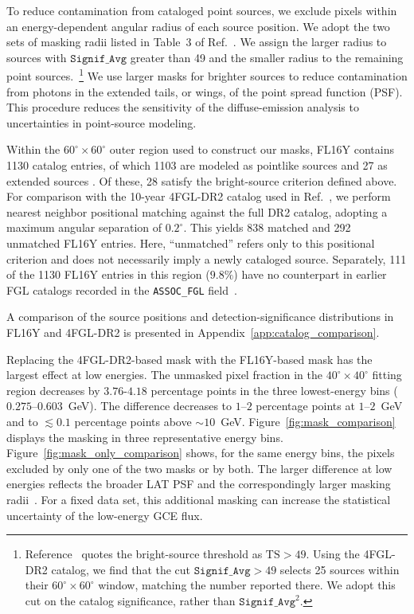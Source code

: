 \documentclass[superscriptaddress,
showpacs,preprintnumbers,nofootinbib,eqsecnum,amsmath,amssymb,aps,11pt, groupedaddress, floatfix]{revtex4-2}
\begin{document}
To reduce contamination from cataloged point sources, we exclude pixels within an energy-dependent angular radius of each source position.
We adopt the two sets of masking radii listed in Table~3 of Ref.~\cite{Cholis:2021rpp}.
We assign the larger radius to sources with $\texttt{Signif\_Avg}$ greater than 49 and the smaller radius to the remaining point sources.~\footnote{Reference~\cite{Cholis:2021rpp} quotes the bright-source threshold as $\mathrm{TS}>49$. Using the 4FGL-DR2 catalog, we find that the cut $\texttt{Signif\_Avg} > 49$ selects 25 sources within their $60^\circ\times60^\circ$ window, matching the number reported there. We adopt this cut on the catalog significance, rather than $\texttt{Signif\_Avg}^2$.}
We use larger masks for brighter sources to reduce contamination from photons in the extended tails, or wings, of the point spread function (PSF).
This procedure reduces the sensitivity of the diffuse-emission analysis to uncertainties in point-source modeling.


Within the $60^\circ\times60^\circ$ outer region used to construct our masks, FL16Y contains 1130 catalog entries, of which 1103 are modeled as pointlike sources and 27 as extended sources \cite{Ballet:2026kpq}. Of these, 28 satisfy the bright-source criterion defined above. For comparison with the 10-year 4FGL-DR2 catalog used in Ref.~\cite{Cholis:2021rpp}, we perform nearest neighbor positional matching against the full DR2 catalog, adopting a maximum angular separation of $0.2^\circ$. This yields 838 matched and 292 unmatched FL16Y entries. Here, ``unmatched'' refers only to this positional criterion and does not necessarily imply a newly cataloged source. Separately, 111 of the 1130 FL16Y entries in this region ($9.8\%$) have no counterpart in earlier FGL catalogs recorded in the \texttt{ASSOC\_FGL} field~\cite{Ballet:2026kpq}.
  
A comparison of the source positions and detection-significance distributions in FL16Y and 4FGL-DR2 is presented in Appendix~\ref{app:catalog_comparison}.

Replacing the 4FGL-DR2-based mask with the FL16Y-based mask has the largest effect at low energies.
The unmasked pixel fraction in the $40^\circ\times40^\circ$ fitting region decreases by $3.76$-$4.18$ percentage points in the three lowest-energy bins ($0.275$--$0.603$~GeV).
The difference decreases to $1$--$2$ percentage points at $1$--$2$~GeV and to $\lesssim0.1$ percentage points above $\sim10$~GeV.
Figure~\ref{fig:mask_comparison} displays the masking in three representative energy bins. Figure~\ref{fig:mask_only_comparison} shows, for the same energy bins, the pixels excluded by only one of the two masks or by both.
The larger difference at low energies reflects the broader LAT PSF and the correspondingly larger masking radii~\cite{Ballet:2026kpq}.
For a fixed data set, this additional masking can increase the statistical uncertainty of the low-energy GCE flux.
\end{document}
